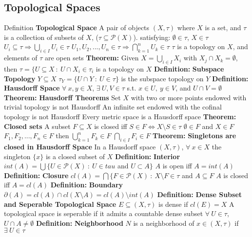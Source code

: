 \documentclass[14pt]{extarticle}
\def\Definition{{\color{Blue} \textbf{Definition:} }}
\def\Theorem{{\color{Red} \textbf{Theorem:} }}
\begin{document}
\begin{outline}
		\section{Topological Spaces}
		\1	Definition \textbf{Topological Space}
			\2	A pair of objects $(X,\tau)$ where $X$ is a set, and $\tau$ is a 
					collection of subsets of $X$, ($\tau \subseteq \mathcal{P}(X)$).
					satisfying:
						\3	$\emptyset \in \tau$, $X \in \tau$
						\3	$U_i \subseteq \tau \Rightarrow \bigcup_{i \in I} U_i \in \tau$
						\3	$U_1,U_2,...,U_n \in \tau \Rightarrow \bigcap_{k=1}^n U_k \in \tau$
			\2	$\tau$ is a topology on $X$, and elements of $\tau$ are open sets
		\1	\Theorem Given $X = \bigcup_{i \in I} X_i$ with $X_j \cap X_k = \emptyset$,
								 then $\tau = \{U \subseteq X~:~U \cap X_i \in \tau_i$ is a 
								 topology on $X$
		\1	\Definition \textbf{Subspace Topology}
			\2	$Y \subseteq X$
			\2	$\tau_Y = \{U \cap Y~:~U \in \tau\}$ is the subspace topology on $Y$
		\1	\Definition \textbf{Hausdorff Space}
			\2	$\forall~x,y \in X$, $\exists~U,V \in \tau$ s.t. $x \in U,~y \in V$,
					and $U \cap V = \emptyset$
		\1	\Theorem \textbf{Hausdorff Theorems}
			\2	Set $X$ with two or more points endowed with trivial topology is not
					Hausdorff
			\2	An infinite set endowed with the cofinal topology is not Hausdorff
			\2	Every metric space is a Hausdorff space
		\1	\Theorem \textbf{Closed sets}
			\2	A subset $F \subseteq X$ is closed iff $S \in F \Leftrightarrow X \setminus S \in \tau$
			\2	$\emptyset \in F$ and $X \in F$
			\2	$F_1,F_2,...,F_n \in F$ then $\bigcup_{k=1}^n F_k \in F$
			\2	$\bigcap_{i \in I} F_i \in F$
		\1	\Theorem \textbf{Singletons are closed in Hausdorff Space}
			\2	In a Hausdorff space $(X,\tau)$, $\forall~x \in X$ the
					singleton $\{x\}$ is a closed subset of $X$
		\1	\Definition \textbf{Interior}
			\2	$int(A) = \bigcup\{U \in \mathcal{P}(X)~:~U \in tau$  and $ U \subset A\}$
			\2	$A$ is open iff $A = int(A)$
		\1	\Definition \textbf{Closure}
			\2	$cl(A) = \bigcap\{F \in \mathcal{P}(X)~:~X \setminus F \in \tau$ and $A \subseteq F$
			\2	$A$ is closed iff $A = cl(A)$
		\1	\Definition \textbf{Boundary}
			\2	$\partial(A) = cl(A) \cap cl(X \setminus A) = cl(A) \setminus int(A)$
		\1	\Definition \textbf{Dense Subset and Seperable Topological Space}
			\2	$E \subseteq (X,\tau)$ is dense if $cl(E) = X$
			\2	A topological space is seperable if it admits a countable dense subset
			\2	$\forall~U \in \tau$, $U \cap A \ne \emptyset$
		\1	\Definition \textbf{Neighborhood}
			\2	$N$ is a neighborhood of $x \in (X,\tau)$ if $\exists~U \in \tau$

\end{outline}
\end{document}
